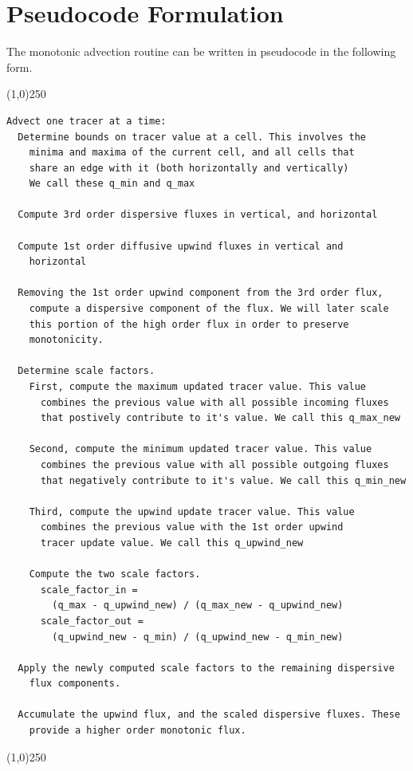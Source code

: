 \documentclass[11pt]{report}
\begin{document}
\chapter{Pseudocode Formulation}
The monotonic advection routine can be written in pseudocode in the following form.
\begin{center}
	\line(1,0){250}
\end{center}
\begin{lstlisting}
Advect one tracer at a time:
  Determine bounds on tracer value at a cell. This involves the 
    minima and maxima of the current cell, and all cells that 
    share an edge with it (both horizontally and vertically)
    We call these q_min and q_max
	
  Compute 3rd order dispersive fluxes in vertical, and horizontal

  Compute 1st order diffusive upwind fluxes in vertical and 
    horizontal

  Removing the 1st order upwind component from the 3rd order flux, 
    compute a dispersive component of the flux. We will later scale 
	this portion of the high order flux in order to preserve 
	monotonicity.

  Determine scale factors.
    First, compute the maximum updated tracer value. This value 
      combines the previous value with all possible incoming fluxes 
      that postively contribute to it's value. We call this q_max_new

    Second, compute the minimum updated tracer value. This value 
      combines the previous value with all possible outgoing fluxes 
      that negatively contribute to it's value. We call this q_min_new

    Third, compute the upwind update tracer value. This value 
      combines the previous value with the 1st order upwind 
      tracer update value. We call this q_upwind_new

    Compute the two scale factors.
      scale_factor_in = 
        (q_max - q_upwind_new) / (q_max_new - q_upwind_new)
      scale_factor_out = 
        (q_upwind_new - q_min) / (q_upwind_new - q_min_new)

  Apply the newly computed scale factors to the remaining dispersive 
    flux components.

  Accumulate the upwind flux, and the scaled dispersive fluxes. These 
    provide a higher order monotonic flux.
\end{lstlisting}
\begin{center}
	\line(1,0){250}
\end{center}
\end{document}
